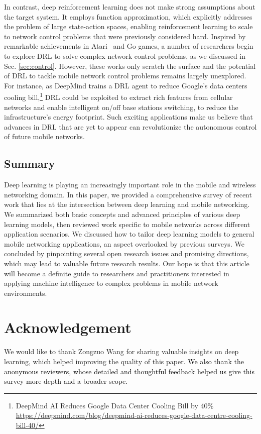 \documentclass[journal,comsoc,letter]{IEEEtran}
\newcommand{\edit}[1]{\textcolor{black}{#1}}
\begin{document}
In contrast, deep reinforcement learning does not make strong assumptions about the target system. It employs function approximation, which explicitly addresses the problem of large state-action spaces, enabling reinforcement learning to scale to network control problems that were previously considered hard. Inspired by remarkable achievements in Atari~\cite{mnih2015human} and Go \cite{Silver1140} games, a number of researchers begin to explore DRL to solve complex network control problems, as we discussed in Sec. \ref{sec:control}. However, these works only scratch the surface and the potential of DRL to tackle mobile network control problems remains largely unexplored. For instance, as DeepMind trains a DRL agent to reduce Google's data centers cooling bill,\footnote{DeepMind AI Reduces Google Data Center Cooling Bill by 40\% \url{https://deepmind.com/blog/deepmind-ai-reduces-google-data-centre-cooling-bill-40/}} DRL could be exploited to extract rich features from cellular networks and enable intelligent on/off base stations switching, to reduce the infrastructure's energy footprint. Such exciting applications make us believe that advances in DRL that are yet to appear can revolutionize the autonomous control of future mobile networks.






\subsection{Summary}\label{sec:conclusion}
Deep learning is playing an increasingly important role in the mobile and wireless networking domain. In this paper, we provided a comprehensive survey of recent work that lies at the intersection between deep learning and mobile networking. We summarized both basic concepts and advanced principles of various deep learning models, then reviewed work specific to mobile networks across different application scenarios. We discussed how to tailor deep learning models to general mobile networking applications, an aspect overlooked by previous surveys. We concluded by pinpointing several open research issues and promising directions, which may lead to valuable future research results. Our hope is that this article will become a definite guide to researchers and practitioners interested in applying machine intelligence to complex problems in mobile network environments. 


\section*{Acknowledgement}
We would like to thank Zongzuo Wang for sharing valuable insights on deep learning, which helped improving the quality of this paper. \edit{We also thank the anonymous reviewers, whose detailed and thoughtful feedback helped us give this survey more depth and a broader scope.} 



\ifCLASSOPTIONcaptionsoff
  \newpage
\fi



\end{document}
